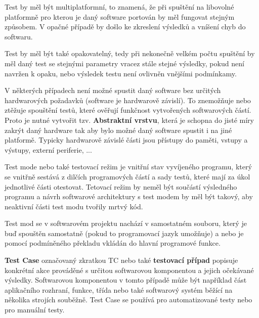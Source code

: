 


Test by měl být multiplatformní, to znamená, že při spuštění na libovolné platformně pro kterou je daný software portován by měl fungovat stejným způsobem. V opačné případě by došlo ke zkreslení výsledků a vníšení chyb do softwaru.

Test by měl být také opakovatelný, tedy při nekonečně velkém počtu spuštění by měl daný test se stejnými parametry vracez stále stejné výsledky, pokud není navržen k opaku, nebo výsledek testu není ovlivněn vnějšími podmínkamy.


V některých případech není možné spustit daný software bez určitých hardwarových požadavků (software je hardwarově závislí). To znemožňuje nebo ztěžuje spouštění testů, které ověřují funkčnost vytvořených softwarových částí. Proto je nutné vytvořit tzv. {\bf Abstraktní vrstvu}, která je schopna do jisté míry zakrýt daný hardware tak aby bylo možné daný software spustit i na jiné platformě. Typicky hardwarově závislé části jsou přístupy do paměti, vstupy a výstupy, externí periferie, ...





Test mode nebo také testovací režim je vnitřní stav vyvíjeného programu, který se vnitřně sestává z dilčích programových částí a sady testů, které mají za úkol jednotlivé části otestovat. Tetovací režim by neměl být součástí výsledného programu a návrh softwarové architektury s test modem by měl být takový, aby neaktivní části test modu tvořily mrtvý kód.


Test mod se v softwarovém projektu nachází v samostatném souboru, který je buď spouštěn samostatně (pokud to programovací jazyk umožňuje) a nebo je pomocí podmíněného překladu vkládán do hlavní programové funkce.


{\bf Test Case} označovaný zkratkou TC nebo také {\bf testovací případ} popisuje konkrétní akce prováděné s určitou softwarovou komponentou a jejich očekávané výsledky. Softwarovou komponentou v tomto případě může být například část aplikačního rozhraní, funkce, třída nebo také softwarový systém běžící na několika strojích souběžně. Test Case se používá pro automatizované testy nebo pro manuální testy. 

